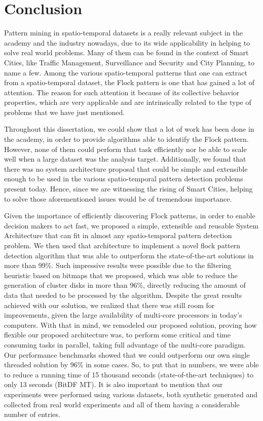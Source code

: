 \chapter{Conclusion}
\label{chp:conclusion}
Pattern mining in spatio-temporal datasets is a really relevant subject in the academy and the industry nowadays, due
to its wide applicability in helping to solve real world problems. Many of them can be found in the context of Smart
Cities, like Traffic Management, Surveillance and Security and City Planning, to name a few. Among the various
spatio-temporal patterns that one can extract from a spatio-temporal dataset, the Flock pattern is one that has gained a
lot of attention. The reason for such attention it because of its collective behavior properties, which are very
applicable and are intrinsically related to the type of problems that we have just mentioned.

Throughout this dissertation, we could show that a lot of work has been done in the academy, in order to provide
algorithms able to identify the Flock pattern. However, none of them could perform that task efficiently nor be able to
scale well when a large dataset was the analysis target. Additionally, we found that there was no system architecture
proposal that could be simple and extensible enough to be used in the various spatio-temporal pattern detection problems
present today. Hence, since we are witnessing the rising of Smart Cities, helping to solve those aforementioned issues
would be of tremendous importance.

Given the importance of efficiently discovering Flock patterns, in order to enable decision makers to act fast, we
proposed a simple, extensible and reusable System Architecture that can fit in almost any spatio-temporal pattern
detection problem. We then used that architecture to implement a novel flock pattern detection algorithm that was able
to outperform the state-of-the-art solutions in more than 99\%. Such impressive results were possible due to the
filtering heuristic based on bitmaps that we proposed, which was able to reduce the generation of cluster disks in more
than 96\%, directly reducing the amount of data that needed to be processed by the algorithm. Despite the great results
achieved with our solution, we realized that there was still room for improvements, given the large availability of
multi-core processors in today's computers. With that in mind, we remodeled our proposed solution, proving how flexible
our proposed architecture was, to perform some critical and time consuming tasks in parallel, taking full advantage of
the multi-core paradigm. Our performance benchmarks showed that we could outperform our own single threaded solution by
96\% in some cases. So, to put that in numbers, we were able to reduce a running time of 15 thousand seconds
(state-of-the-art techniques) to only 13 seconds (BitDF MT). It is also important to mention that our experiments were
performed using various datasets, both synthetic generated and collected from real world experiments and all of them
having a considerable number of entries.

